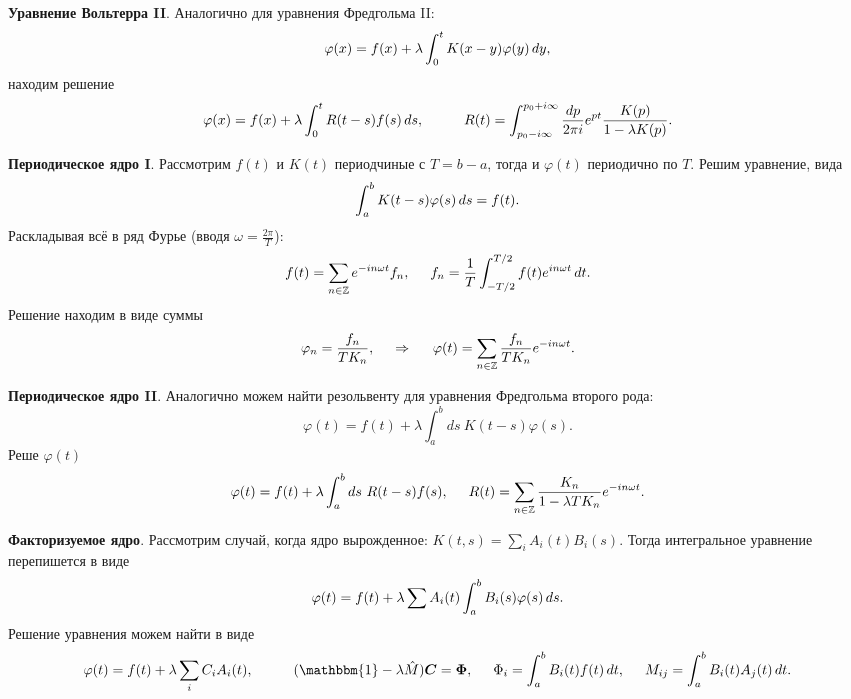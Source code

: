 \textbf{Уравнение Вольтерра II}.
Аналогично для уравнения Фредгольма II:
\begin{equation}
	\varphi(x) = f(x) + \lambda \int_{0}^{t} K(x-y) \varphi(y) \, d y,
\end{equation}
находим решение
\begin{equation*}
	\varphi(x) = f(x) + \lambda \int_{0}^{t} R(t-s) f(s) \d s,
	\hspace{10 mm} 
	R(t) = \int_{p_0 - i \infty}^{p_0 + i \infty} \frac{dp}{2\pi i} e^{pt} \frac{K(p)}{1-\lambda K(p)}.
\end{equation*}



\textbf{Периодическое ядро I}. Рассмотрим $f(t)$ и $K(t)$ периодчиные с $T = b-a$, тогда и $\varphi(t)$ периодично по $T$. Решим уравнение, вида
\begin{equation}
	\int_{a}^{b} K(t-s) \varphi(s) \, d s = f(t).
\end{equation}
Раскладывая всё в ряд Фурье (вводя $\omega = \frac{2\pi}{T}$):
\begin{equation*}
	f(t) = \sum_{n \in \mathbb{Z}} e^{-in \omega t} f_n,
	\hspace{5 mm} f_n = \frac{1}{T} \int_{-T/2}^{T/2} f(t) e^{i n \omega t} \, d t.
\end{equation*}
Решение находим в виде суммы
\begin{equation}
	\varphi_n = \frac{f_n}{T K_n},
	\hspace{0.5cm} \Rightarrow \hspace{0.5cm}
	\varphi(t) = \sum_{n \in \mathbb{Z}} \frac{f_n}{T K_n} e^{-i n \omega t}.
\end{equation}

\textbf{Периодическое ядро II}. Аналогично можем найти резольвенту для уравнения Фредгольма второго рода:
\begin{equation*}
	\varphi(t) = f(t) +  \lambda \int_{a}^{b} ds\ K(t-s) \varphi(s).
\end{equation*}
Реше $\varphi(t)$
\begin{equation}
	\varphi(t) = f(t) + \lambda \int_{a}^{b} ds\ R(t-s) f(s),
	\hspace{5 mm} 
	R(t) = \sum_{n \in \mathbb{Z}} \frac{K_n}{1-\lambda T K_n} e^{-i n \omega t}.
\end{equation}


\textbf{Факторизуемое ядро}. Рассмотрим случай, когда ядро вырожденное: $K(t, s) = \sum_i A_i (t) B_i (s)$.  Тогда интегральное уравнение перепишется в виде
\begin{equation*}
	\varphi(t) = f(t) + \lambda  \sum A_i(t)  \int_{a}^{b} B_i (s) \varphi(s) \, d s.
\end{equation*}
Решение уравнения можем найти в виде
\begin{equation*}
	\varphi(t) = f(t) + \lambda \sum_i C_i A_i (t),
	\hspace{10 mm} 
	(\mathbbm{1} - \lambda \hat{M}) \vc{C} = \vc{\Phi},
	\hspace{5 mm} 
	\Phi_i = \int_{a}^{b} B_i (t) f(t) \d t,
	\hspace{5 mm} 
	M_{ij} = \int_{a}^{b} B_i(t) A_j(t) \d t.
\end{equation*}



